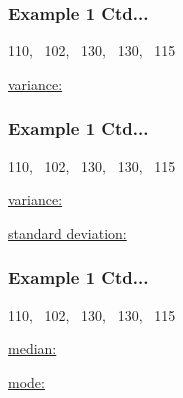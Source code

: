 \documentclass[xcolor=svgnames, compress]{beamer}
\begin{document}
\begin{frame}[t]
\frametitle{Example 1 Ctd...} 

\vspace{-0.50cm}
\begin{center}
110, ~102, ~130, ~130, ~115
\end{center}

\vspace{-0.5cm}
\underline{variance:}

%


\end{frame}



\begin{frame}[t]
\frametitle{Example 1 Ctd...} 

\vspace{-0.50cm}
\begin{center}
110, ~102, ~130, ~130, ~115
\end{center}

\vspace{-0.5cm}
\underline{variance:}

\vspace{5.40cm}

\underline{standard deviation:}


\end{frame}




\begin{frame}[t]
\frametitle{Example 1 Ctd...} 

\vspace{-0.50cm}

\begin{center}
110, ~102, ~130, ~130, ~115
\end{center}

\vspace{-0.5cm}
\underline{median:}

\vspace{4.5cm}

\underline{mode:}


\end{frame}
\end{document}
